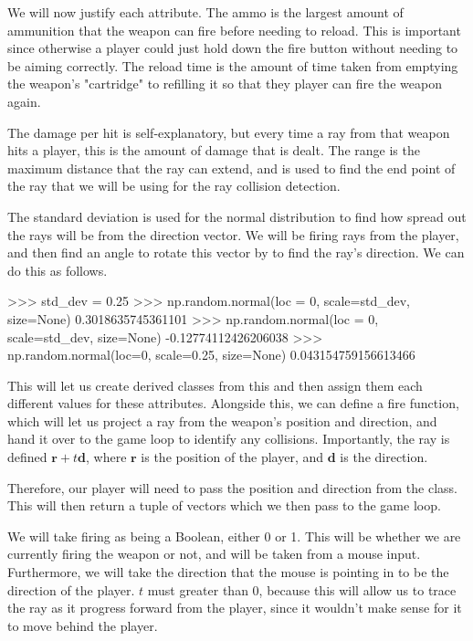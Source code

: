 We will now justify each attribute. The ammo is the largest amount of ammunition that the weapon can fire before needing to reload. This is important since otherwise a player could just hold down the fire button without needing to be aiming correctly. The reload time is the amount of time taken from emptying the weapon's "cartridge" to refilling it so that they player can fire the weapon again.

\vs
The damage per hit is self-explanatory, but every time a ray from that weapon hits a player, this is the amount of damage that is dealt. The range is the maximum distance that the ray can extend, and is used to find the end point of the ray that we will be using for the ray collision detection.

\vs
The standard deviation is used for the normal distribution to find how spread out the rays will be from the direction vector. We will be firing rays from the player, and then find an angle to rotate this vector by to find the ray's direction. We can do this as follows.

\begin{mpy}
>>> std_dev = 0.25
>>> np.random.normal(loc = 0, scale=std_dev, size=None)
0.3018635745361101
>>> np.random.normal(loc = 0, scale=std_dev, size=None)
-0.12774112426206038
>>> np.random.normal(loc=0, scale=0.25, size=None)
0.043154759156613466
\end{mpy}
\vs
This will let us create derived classes from this and then assign them each different values for these attributes. Alongside this, we can define a fire function, which will let us project a ray from the weapon's position and direction, and hand it over to the game loop to identify any collisions. Importantly, the ray is defined $\mathbf{r} + t \mathbf{d}$, where $\mathbf{r}$ is the position of the player, and $\mathbf{d}$ is the direction.
\vs

Therefore, our player will need to pass the position and direction from the  class. This will then return a tuple of vectors which we then pass to the game loop.
\vs

We will take firing as being a Boolean, either 0 or 1. This will be whether we are currently firing the weapon or not, and will be taken from a mouse input. Furthermore, we will take the direction that the mouse is pointing in to be the direction of the player. $t$ must greater than 0, because this will allow us to trace the ray as it progress forward from the player, since it wouldn't make sense for it to move behind the player.
\vs

